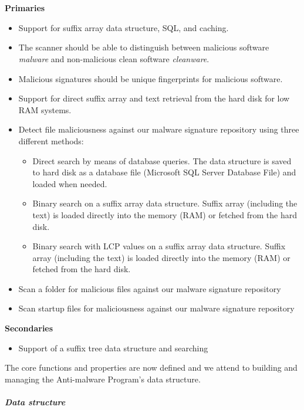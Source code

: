 \documentclass[12pt]{article} %
\begin{document}
\\ \\
\textbf{Primaries} 
\begin{itemize}
  \item Support for suffix array data structure, SQL, and caching.
  \item The scanner should be able to distinguish between malicious software \emph{malware} and non-malicious clean software \emph{cleanware}.
  \item Malicious signatures should be unique fingerprints for malicious software.
  \item Support for direct suffix array and text retrieval from the hard disk for low RAM systems.
  \item Detect file maliciousness against our malware signature repository using three different methods:
  	\begin{itemize}
  	\item Direct search by means of database queries. The data structure is saved to hard disk as a database file (Microsoft SQL Server Database File) and loaded when needed.
  	\item Binary search on a suffix array data structure. Suffix array (including the text) is loaded directly into the memory (RAM) or fetched from the hard disk. 
  	\item Binary search with LCP values on a suffix array data structure. Suffix array (including the text) is loaded directly into the memory (RAM) or fetched from the hard disk. 
	\end{itemize} 
  \item Scan a folder for malicious files against our malware signature repository 
  \item Scan startup files for maliciousness against our malware signature repository
\end{itemize}
\textbf{Secondaries} 
\begin{itemize}
  \item Support of a suffix tree data structure and searching
\end{itemize}
The core functions and properties are now defined and we attend to building and managing the Anti-malware Program's data structure. 
\\ \\
\textbf{\emph{Data structure}} 
\\ \\
\end{document}
